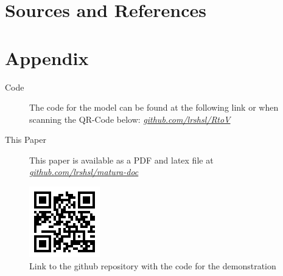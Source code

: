 \documentclass[12pt, a4paper, titlepage]{report}
\let\oldhref\href
\renewcommand{\href}[2]{\oldhref{#1}{\itshape#2}}
\begin{document}
\chapter{Sources and References}

\nocite{*}  %

\begin{refcontext}[labelprefix=T]
   \printbibliography[type=misc, keyword={TextResource}, title={Text Sources and References}]
\end{refcontext}

\begin{refcontext}[labelprefix=I]
  \printbibliography[type=misc, keyword={ImageResource}, title={Image Resources}]
\end{refcontext}

\begin{refcontext}[labelprefix=A]
   \printbibliography[type=misc, keyword={AITool}, title={AI Tools}]
\end{refcontext}



\chapter{Appendix}

\begin{description}
   \item[Code] The code for the model can be found at the following link or when scanning the QR-Code below: \href{https://github.com/lrshsl/rtov.git}{github.com/lrshsl/RtoV}
   \item[This Paper] This paper is available as a PDF and latex file at \href{https://github.com/lrshsl/matura-doc/tree/main/matura_thesis}{github.com/lrshsl/matura-doc}
\end{description}


\begin{figure}[b]
   \centering
   \includegraphics{../rc/images/QrCode_LinkRepo.png}
   \caption{Link to the github repository with the code for the demonstration}
\end{figure}
\end{document}
